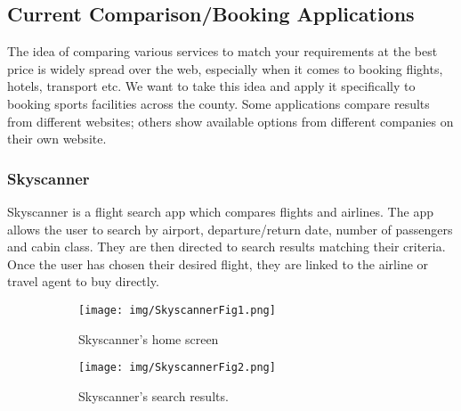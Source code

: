 \subsection{Current Comparison/Booking Applications}
\label{sub:current_comparison_applications}

The idea of comparing various services to match your requirements at the best
price is widely spread over the web, especially when it comes to booking
flights, hotels, transport etc.  We want to take this idea and apply it
specifically to booking sports facilities across the county.  Some applications
compare results from different websites; others show available options from
different companies on their own website.

\subsubsection{Skyscanner}
\label{ssub:skyscanner}

Skyscanner is a flight search app which compares flights and airlines. The app
allows the user to search by airport, departure/return date, number of
passengers and cabin class. They are then directed to search results matching
their criteria. Once the user has chosen their desired flight, they are linked
to the airline or travel agent to buy directly.
\begin{figure}[ht]
	\centering
	\begin{subfigure}[b]{0.2\textwidth}
		\texttt{[image: img/SkyscannerFig1.png]}
		\caption{Skyscanner's home screen}\label{fig:skyscannerfig1}
	\end{subfigure}%
	\qquad
	\begin{subfigure}[b]{0.2\textwidth}
		\texttt{[image: img/SkyscannerFig2.png]}
		\caption{Skyscanner's search results.}
	\end{subfigure}
	\caption{}\label{fig:skyscanner1}
\end{figure}

